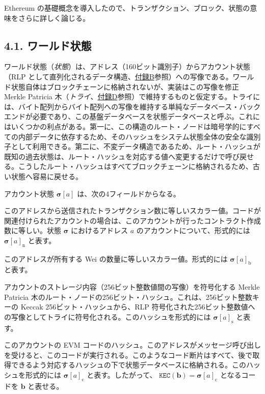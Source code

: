 \documentclass[
]{ltjsarticle}
\providecommand{\tightlist}{%
  \setlength{\itemsep}{0pt}\setlength{\parskip}{0pt}}
\begin{document}
Ethereum
の基礎概念を導入したので、トランザクション、ブロック、状態の意味をさらに詳しく論じる。

\protect\hypertarget{ch:state}{}{}

\hypertarget{ux30efux30fcux30ebux30c9ux72b6ux614b}{%
\subsection{4.1.
ワールド状態}\label{ux30efux30fcux30ebux30c9ux72b6ux614b}}

ワールド状態（\emph{状態}）は、アドレス（160ビット識別子）からアカウント状態（RLP
として直列化されるデータ構造、\protect\hyperlink{app:rlp}{付録B}参照）への写像である。ワールド状態自体はブロックチェーンに格納されないが、実装はこの写像を修正
Merkle Patricia
木（\emph{トライ}、\protect\hyperlink{app:trie}{付録D}参照）で維持するものと仮定する。トライには、バイト配列からバイト配列への写像を維持する単純なデータベース・バックエンドが必要であり、この基盤データベースを状態データベースと呼ぶ。これにはいくつかの利点がある。第一に、この構造のルート・ノードは暗号学的にすべての内部データに依存するため、そのハッシュをシステム状態全体の安全な識別子として利用できる。第二に、不変データ構造であるため、ルート・ハッシュが既知の過去状態は、ルート・ハッシュを対応する値へ変更するだけで呼び戻せる。こうしたルート・ハッシュはすべてブロックチェーンに格納されるため、古い状態へ容易に戻せる。

アカウント状態 \(\boldsymbol{\sigma}[a]\) は、次の4フィールドからなる。

\protect\hypertarget{account_nonce}{}{}

\begin{description}
\tightlist
\item[nonce]
このアドレスから送信されたトランザクション数に等しいスカラー値。コードが関連付けられたアカウントの場合は、このアカウントが行ったコントラクト作成数に等しい。状態
\(\boldsymbol{\sigma}\) におけるアドレス \(a\)
のアカウントについて、形式的には \(\boldsymbol{\sigma}[a]_{\mathrm{n}}\)
と表す。
\item[balance]
このアドレスが所有する Wei の数量に等しいスカラー値。形式的には
\(\boldsymbol{\sigma}[a]_{\mathrm{b}}\) と表す。
\item[storageRoot]
アカウントのストレージ内容（256ビット整数値間の写像）を符号化する Merkle
Patricia
木のルート・ノードの256ビット・ハッシュ。これは、256ビット整数キーの
Keccak 256ビット・ハッシュから、RLP
符号化された256ビット整数値への写像としてトライに符号化される。このハッシュを形式的には
\(\boldsymbol{\sigma}[a]_{\mathrm{s}}\) と表す。
\item[codeHash]
このアカウントの EVM
コードのハッシュ。このアドレスがメッセージ呼び出しを受けると、このコードが実行される。このようなコード断片はすべて、後で取得できるよう対応するハッシュの下で状態データベースに格納される。このハッシュを形式的には
\(\boldsymbol{\sigma}[a]_{\mathrm{c}}\) と表す。したがって、
\(\texttt{KEC}(\mathbf{b}) = \boldsymbol{\sigma}[a]_{\mathrm{c}}\)
となるコードを \(\mathbf{b}\) と表せる。
\end{description}
\end{document}
